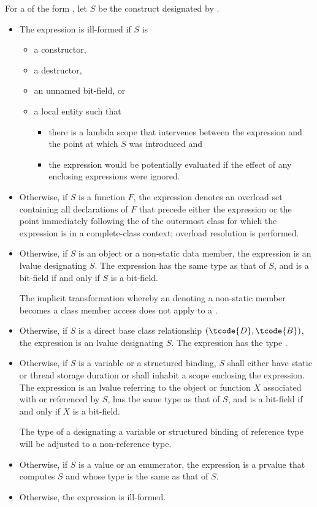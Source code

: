 \pnum
For a  of the form ,
let $S$ be the construct designated by .
\begin{itemize}
\item
The expression is ill-formed if $S$ is
\begin{itemize}
\item
a constructor,
\item
a destructor,
\item
an unnamed bit-field, or
\item
a local entity such that
\begin{itemize}
\item
there is a lambda scope that intervenes
between the expression and the point at which $S$ was introduced and
\item
the expression would be potentially evaluated
if the effect of any enclosing  expressions
were ignored.
\end{itemize}
\end{itemize}
\item
Otherwise, if $S$ is a function $F$,
the expression denotes an overload set containing all declarations of $F$
that precede either the expression or
the point immediately following the  of
the outermost class for which the expression is in a complete-class context;
overload resolution is performed.
\item
Otherwise, if $S$ is an object or a non-static data member,
the expression is an lvalue designating $S$.
The expression has the same type as that of $S$, and
is a bit-field if and only if $S$ is a bit-field.
\begin{note}
The implicit transformation
whereby an  denoting a non-static member
becomes a class member access
does not apply to a .
\end{note}
\item
Otherwise, if $S$ is a direct base class relationship $(\tcode{D}, \tcode{B})$,
the expression is an lvalue designating $S$.
The expression has the type .
\item
Otherwise, if $S$ is a variable or a structured binding,
$S$ shall either have static or thread storage duration or
shall inhabit a scope enclosing the expression.
The expression is an lvalue referring to the object or function $X$
associated with or referenced by $S$,
has the same type as that of $S$, and
is a bit-field if and only if $X$ is a bit-field.
\begin{note}
The type of a 
designating a variable or structured binding of reference type
will be adjusted to a non-reference type.
\end{note}
\item
Otherwise, if $S$ is a value or an enumerator,
the expression is a prvalue that computes $S$ and
whose type is the same as that of $S$.
\item
Otherwise, the expression is ill-formed.
\end{itemize}

